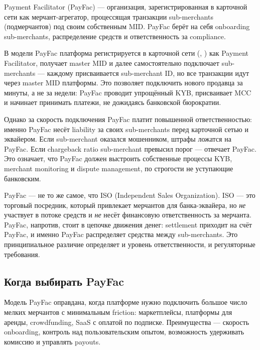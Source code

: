 \begin{kaobox}[title={Определение: Payment Facilitator}, colback=blue!4, colbacktitle=blue!15]
  Payment Facilitator (PayFac) — организация, зарегистрированная
  в карточной сети как мерчант-агрегатор, процессящая транзакции
  sub-merchants (подмерчантов) под своим собственным MID.
  PayFac берёт на себя onboarding sub-merchants, распределение
  средств и ответственность за compliance.
\end{kaobox}

В модели PayFac платформа регистрируется в карточной сети
(, ) как Payment Facilitator,
получает master MID и далее самостоятельно подключает
sub-merchants — каждому присваивается sub-merchant ID,
но все транзакции идут через master MID платформы. Это позволяет
подключить нового продавца за минуты, а не за недели: PayFac
проводит упрощённый KYB, присваивает MCC и начинает принимать
платежи, не дожидаясь банковской бюрократии.

Однако за скорость подключения PayFac платит повышенной
ответственностью: именно PayFac несёт liability
за своих sub-merchants перед карточной сетью и эквайером.
Если sub-merchant оказался мошенником, штрафы ложатся
на PayFac. Если chargeback ratio sub-merchant превысил
порог — отвечает PayFac. Это означает, что PayFac
должен выстроить собственные процессы KYB, merchant
monitoring и dispute management, по строгости не уступающие
банковским.

\begin{kaobox}[title=Важно, colback=red!5, colbacktitle=red!20]
  PayFac — не то же самое, что ISO (Independent Sales
  Organization). ISO — это торговый посредник, который
  привлекает мерчантов для банка-эквайера, но \emph{не} участвует
  в потоке средств и \emph{не} несёт финансовую ответственность
  за мерчанта. PayFac, напротив, стоит в цепочке движения денег:
  settlement приходит на счёт PayFac, и именно PayFac распределяет
  средства между sub-merchants. Это принципиальное различие
  определяет и уровень ответственности, и регуляторные
  требования.
\end{kaobox}

\subsection*{Когда выбирать PayFac}

Модель PayFac оправдана, когда платформе нужно подключить
большое число мелких мерчантов с минимальным friction: маркетплейсы,
платформы для аренды, crowdfunding, SaaS с оплатой по подписке.
Преимущества — скорость onboarding, контроль над пользовательским
опытом, возможность удерживать комиссию и управлять payouts.

